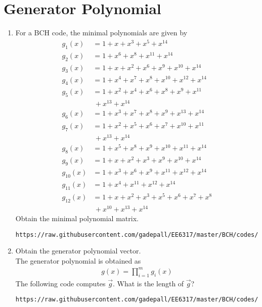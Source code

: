 \documentclass[journal,12pt,twocolumn]{IEEEtran}
\renewcommand\thesection{\arabic{section}}
\begin{document}
\section{Generator Polynomial}
\begin{enumerate}[label=\thesection.\arabic*
,ref=\thesection.\theenumi]
\item For a BCH code, the minimal polynomials are given by 
\begin{align}
g_1(x)&=1+x+x^3+x^5+x^{14}\\
g_2(x)&=1+x^6+x^8+x^{11}+x^{14}\\
g_3(x)&=1+x+x^2+x^6+x^9+x^{10}+x^{14}\\
g_4(x)&=1+x^4+x^7+x^8+x^10+x^{12}+x^{14}\\
g_5(x)&=1+x^2+x^4+x^6+x^8+x^9+x^{11}
\nonumber \\
&\,+x^{13}+x^{14}\\
g_6(x)&=1+x^3+x^7+x^8+x^9+x^{13}+x^{14}\\
g_7(x)&=1+x^2+x^5+x^6+x^7+x^{10}+x^{11}
\nonumber \\
&\,+x^{13}+x^{14}\\
g_8(x)&=1+x^5+x^8+x^9+x^{10}+x^{11}+x^{14}\\
g_9(x)&=1+x+x^2+x^3+x^9+x^{10}+x^{14}\\
g_{10}(x)&=1+x^3+x^6+x^9+x^{11}+x^{12}+x^{14}\\
g_{11}(x)&=1+x^4+x^{11}+x^{12}+x^{14}\\
g_{12}(x)&=1+x+x^2+x^3+x^5+x^6+x^7+x^8
\nonumber \\
&\,+x^{10}+x^{13}+x^{14}
\end{align}
Obtain the minimal polynomial matrix.
\\
\solution
\begin{lstlisting}
https://raw.githubusercontent.com/gadepall/EE6317/master/BCH/codes/min_poly_mat.py
\end{lstlisting}
\item Obtain the generator polynomial vector.
\\
\solution The generator polynomial is obtained as
\begin{align}
g(x) =\prod_{i = 1}^{m}g_i(x)
\end{align}
%
The following code computes $\vec{g}$. What is the length of $\vec{g}$?
\begin{lstlisting}
https://raw.githubusercontent.com/gadepall/EE6317/master/BCH/codes/gen_poly.py
\end{lstlisting}
\end{enumerate}
\end{document}
